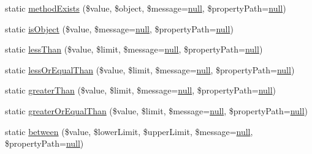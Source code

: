 \begin{DoxyCompactItemize}
\item 
static \mbox{\hyperlink{class_assert_1_1_assertion_aa30dc08ea19bfbc8198816ef813d4ec9}{method\+Exists}} (\$value, \$object, \$message=\mbox{\hyperlink{class_assert_1_1_assertion_af95d8b1582dd619cc0159041bc6892c5}{null}}, \$property\+Path=\mbox{\hyperlink{class_assert_1_1_assertion_af95d8b1582dd619cc0159041bc6892c5}{null}})
\item 
static \mbox{\hyperlink{class_assert_1_1_assertion_a12d702e3018b21817e186c1c33d7cef6}{is\+Object}} (\$value, \$message=\mbox{\hyperlink{class_assert_1_1_assertion_af95d8b1582dd619cc0159041bc6892c5}{null}}, \$property\+Path=\mbox{\hyperlink{class_assert_1_1_assertion_af95d8b1582dd619cc0159041bc6892c5}{null}})
\item 
static \mbox{\hyperlink{class_assert_1_1_assertion_acdca0aac258192eb5bde4dc8abdd10f2}{less\+Than}} (\$value, \$limit, \$message=\mbox{\hyperlink{class_assert_1_1_assertion_af95d8b1582dd619cc0159041bc6892c5}{null}}, \$property\+Path=\mbox{\hyperlink{class_assert_1_1_assertion_af95d8b1582dd619cc0159041bc6892c5}{null}})
\item 
static \mbox{\hyperlink{class_assert_1_1_assertion_ace0d0859b2663681a52dfa5d15e6eef7}{less\+Or\+Equal\+Than}} (\$value, \$limit, \$message=\mbox{\hyperlink{class_assert_1_1_assertion_af95d8b1582dd619cc0159041bc6892c5}{null}}, \$property\+Path=\mbox{\hyperlink{class_assert_1_1_assertion_af95d8b1582dd619cc0159041bc6892c5}{null}})
\item 
static \mbox{\hyperlink{class_assert_1_1_assertion_aa8992ba08862ddcd310363719443aff3}{greater\+Than}} (\$value, \$limit, \$message=\mbox{\hyperlink{class_assert_1_1_assertion_af95d8b1582dd619cc0159041bc6892c5}{null}}, \$property\+Path=\mbox{\hyperlink{class_assert_1_1_assertion_af95d8b1582dd619cc0159041bc6892c5}{null}})
\item 
static \mbox{\hyperlink{class_assert_1_1_assertion_a31f99f0bdd9140ce31f577d1471cca34}{greater\+Or\+Equal\+Than}} (\$value, \$limit, \$message=\mbox{\hyperlink{class_assert_1_1_assertion_af95d8b1582dd619cc0159041bc6892c5}{null}}, \$property\+Path=\mbox{\hyperlink{class_assert_1_1_assertion_af95d8b1582dd619cc0159041bc6892c5}{null}})
\item 
static \mbox{\hyperlink{class_assert_1_1_assertion_af3b679c4051496b6ade3f91c96b17f52}{between}} (\$value, \$lower\+Limit, \$upper\+Limit, \$message=\mbox{\hyperlink{class_assert_1_1_assertion_af95d8b1582dd619cc0159041bc6892c5}{null}}, \$property\+Path=\mbox{\hyperlink{class_assert_1_1_assertion_af95d8b1582dd619cc0159041bc6892c5}{null}})

\end{DoxyCompactItemize}
